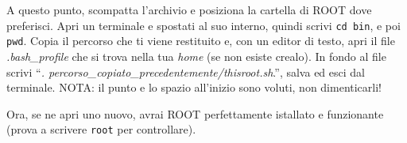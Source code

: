 A questo punto, scompatta l'archivio e posiziona la cartella di ROOT dove preferisci. Apri un terminale e spostati al suo interno, quindi scrivi \verb|cd bin|, e poi \verb|pwd|. Copia il percorso che ti viene restituito e, con un editor di testo, apri il file \emph{.bash\_profile} che si trova nella tua \emph{home} (se non esiste crealo). In fondo al file scrivi ``\emph{. percorso\_copiato\_precedentemente/thisroot.sh}.'', salva ed esci dal terminale.  NOTA: il punto e lo spazio all'inizio sono voluti, non dimenticarli!

Ora, se ne apri uno nuovo, avrai ROOT perfettamente istallato e funzionante (prova a scrivere \verb|root| per controllare).